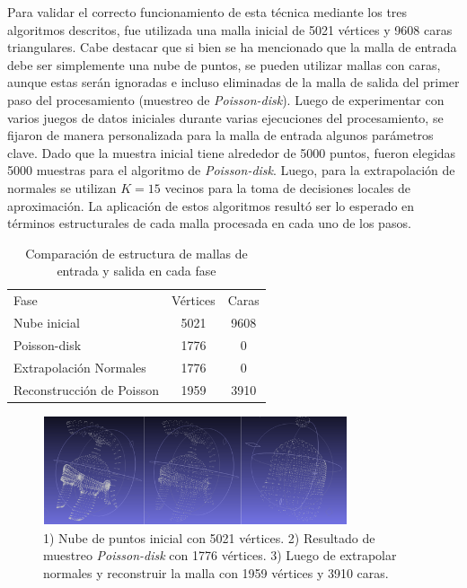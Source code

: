 Para validar el correcto funcionamiento de esta técnica mediante los tres algoritmos descritos, fue utilizada una malla inicial de 5021 vértices y 9608 caras triangulares. Cabe destacar que si bien se ha mencionado que la malla de entrada debe ser simplemente una nube de puntos, se pueden utilizar mallas con caras, aunque estas serán ignoradas e incluso eliminadas de la malla de salida del primer paso del procesamiento (muestreo de \emph{Poisson-disk}).
Luego de experimentar con varios juegos de datos iniciales durante varias ejecuciones del procesamiento, se fijaron de manera personalizada para la malla de entrada algunos parámetros clave. Dado que la muestra inicial tiene alrededor de 5000 puntos, fueron elegidas 5000 muestras para el algoritmo de \emph{Poisson-disk}. Luego, para la extrapolación de normales se utilizan $K=15$ vecinos para la toma de decisiones locales de aproximación.
La aplicación de estos algoritmos resultó ser lo esperado en términos estructurales de cada malla procesada en cada uno de los pasos.

\begin{table}
\begin{center}
\begin{tabular}{|l||cc|} \hline
  Fase & Vértices & Caras \\
  Nube inicial & 5021 & 9608 \\
  Poisson-disk & 1776 & 0 \\
  Extrapolación Normales & 1776 & 0 \\
  Reconstrucción de Poisson & 1959 & 3910 \\ \hline %
\end{tabular}
\caption{Comparación de estructura de mallas de entrada y salida en cada fase}
\end{center}
\end{table}

\begin{figure}[H]
  \centering
    \includegraphics[width=0.8\textwidth]{./Cap2_videomapping/malla-nubepuntos.png}
  \caption[Captura de Meshlab]{1) Nube de puntos inicial con 5021 vértices. 2) Resultado de muestreo \emph{Poisson-disk} con 1776 vértices. 3) Luego de extrapolar normales y reconstruir la malla con 1959 vértices y 3910 caras.}
  \label{fig:Mesh-Results}
\end{figure}
 